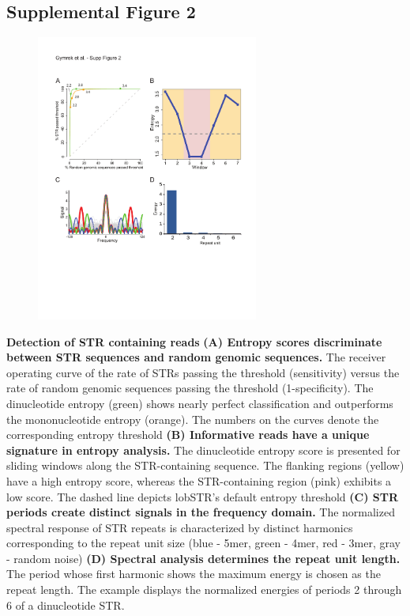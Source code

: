 \subsection{Supplemental Figure 2}
\begin{figure}[h!]
\centering
\label{fig:lobsup2}
\includegraphics[width=0.65\textwidth]{Figures/Chapter2/SuppFig2.pdf}
\end{figure}
\textbf{Detection of STR containing reads} \textbf{(A) Entropy scores discriminate between STR sequences and random genomic sequences.} The receiver operating curve of the rate of STRs passing the threshold (sensitivity) versus the rate of random genomic sequences passing the threshold (1-specificity). The dinucleotide entropy (green) shows nearly perfect classification and outperforms the mononucleotide entropy (orange). The numbers on the curves denote the corresponding entropy threshold \textbf{(B) Informative reads have a unique signature in entropy analysis.} The dinucleotide entropy score is presented for sliding windows along the STR-containing sequence. The flanking regions (yellow) have a high entropy score, whereas the STR-containing region (pink) exhibits a low score. The dashed line depicts lobSTR's default entropy threshold \textbf{(C) STR periods create distinct signals in the frequency domain.} The normalized spectral response of STR repeats is characterized by distinct harmonics corresponding to the repeat unit size (blue - 5mer, green - 4mer, red - 3mer, gray - random noise) \textbf{(D) Spectral analysis determines the repeat unit length.} The period whose first harmonic shows the maximum energy is chosen as the repeat length. The example displays the normalized energies of periods 2 through 6 of a dinucleotide STR. 

